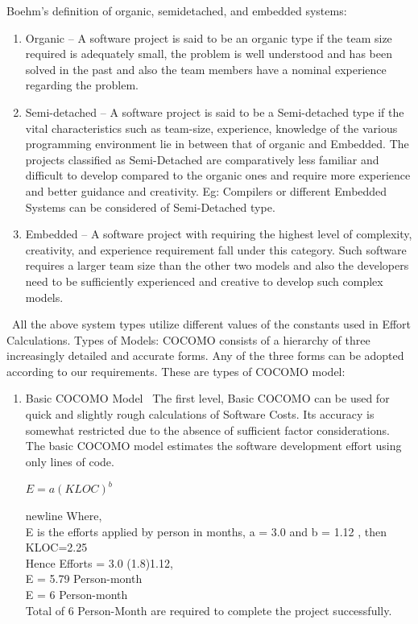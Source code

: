 \documentclass[oneside,a4paper,12pt]{report}
\begin{document}
{Boehm’s definition of organic, semidetached, and embedded systems:
\begin{enumerate}
\item Organic – A software project is said to be an organic type if the team size required is adequately small, the problem is well understood and has been solved in the past and also the team members have a nominal experience regarding the problem.\
\item Semi-detached – A software project is said to be a Semi-detached type if the vital characteristics such as team-size, experience, knowledge of the various programming environment lie in between that of organic and Embedded. The projects classified as Semi-Detached are comparatively less familiar and difficult to develop compared to the organic ones and require more experience and better guidance and creativity. Eg: Compilers or different Embedded Systems can be considered of Semi-Detached type.\
\item Embedded – A software project with requiring the highest level of complexity, creativity, and experience requirement fall under this category. Such software requires a larger team size than the other two models and also the developers need to be sufficiently experienced and creative to develop such complex models.\
\end{enumerate}

\ All the above system types utilize different values of the constants used in Effort Calculations. Types of Models: COCOMO consists of a hierarchy of three increasingly detailed and accurate forms. Any of the three forms can be adopted according to our requirements. These are types of COCOMO model:
\begin{enumerate}
\item Basic COCOMO Model
\ The first level, Basic COCOMO can be used for quick and slightly rough calculations of Software Costs. Its accuracy is somewhat restricted due to the absence of sufficient factor considerations.\\


The basic COCOMO model estimates the software development effort using only lines of code.\\

\begin{center} $ E=a(KLOC)^b $\\
\end{center}
newline Where,\\
 E is the efforts applied by person in months, a = 3.0 and b = 1.12 , then KLOC=2.25\\
 Hence Efforts = 3.0 (1.8)1.12,\\
 E = 5.79 Person-month\\
 E = 6 Person-month\\
 Total of 6 Person-Month are required to complete the project successfully.\\


\end{enumerate}}
\end{document}
